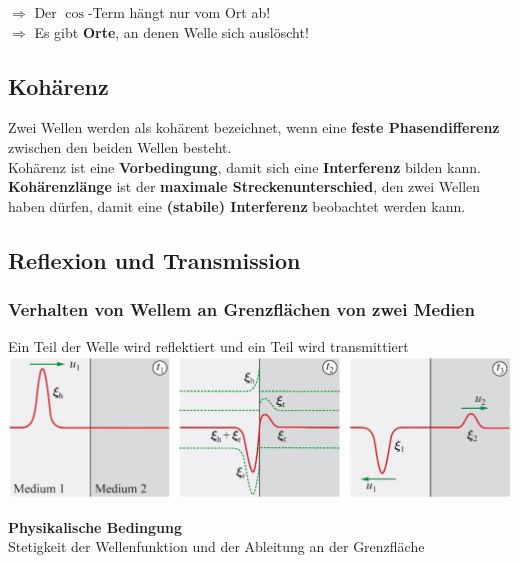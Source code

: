 $\Rightarrow$ Der $\cos$-Term hängt nur vom Ort ab! \\
$\Rightarrow$ Es gibt \textbf{Orte}, an denen Welle sich auslöscht!





\subsection{Kohärenz}

Zwei Wellen werden als kohärent bezeichnet, wenn eine \textbf{feste Phasendifferenz} zwischen den beiden Wellen besteht. \\
\vspace{0.2cm}
Kohärenz ist eine \textbf{Vorbedingung}, damit sich eine \textbf{Interferenz} bilden kann. \\
\vspace{0.2cm}
\textbf{Kohärenzlänge} ist der \textbf{maximale Streckenunterschied}, den zwei Wellen haben dürfen, damit eine \textbf{(stabile) Interferenz} beobachtet werden kann.


\subsection{Reflexion und Transmission}


\subsubsection{Verhalten von Wellem an Grenzflächen von zwei Medien}

Ein Teil der Welle wird reflektiert und ein Teil wird transmittiert \\

\includegraphics[width=0.95\linewidth]{Bilder/Wellen-Optik/reflexion_transmission} \\

\vspace{0.2cm}

\textbf{Physikalische Bedingung}\\
Stetigkeit der Wellenfunktion und der Ableitung an der Grenzfläche

